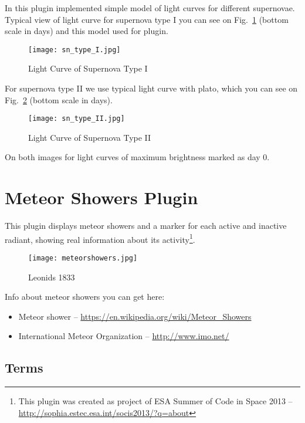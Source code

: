 In this plugin implemented simple model of light curves for different supernovae. Typical view of light curve for supernova type I you can see on Fig.~\ref{fig:SNTypeI} (bottom scale in days) and this model used for plugin.

\begin{figure}[h]
\begin{center}
\texttt{[image: sn\_type\_I.jpg]}
\end{center}
\label{fig:SNTypeI}
\caption{Light Curve of Supernova Type I}
\end{figure}

For supernova type II we use typical light curve with plato, which you can see on Fig.~\ref{fig:SNTypeII} (bottom scale in days).

\begin{figure}[h]
\begin{center}
\texttt{[image: sn\_type\_II.jpg]}
\end{center}
\label{fig:SNTypeII}
\caption{Light Curve of Supernova Type II}
\end{figure}

On both images for light curves of maximum brightness marked as day 0.

\newpage

\section{Meteor Showers Plugin}
\label{sec:plugins:MeteorShowers}

This plugin displays meteor showers and a marker for each active and inactive radiant, showing real information about its activity\footnote{This plugin was created as project of ESA Summer of Code in Space 2013 -- \url{http://sophia.estec.esa.int/socis2013/?q=about}}.

\begin{figure}[h]
\texttt{[image: meteorshowers.jpg]}
\label{fig:MeteorShowers}
\caption{Leonids 1833}
\end{figure}

Info about meteor showers you can get here:
\begin{itemize}
\item Meteor shower -- \url{https://en.wikipedia.org/wiki/Meteor_Showers}
\item International Meteor Organization -- \url{http://www.imo.net/}
\end{itemize}

\subsection{Terms}
\label{sec:plugins:MeteorShowers:terms}


